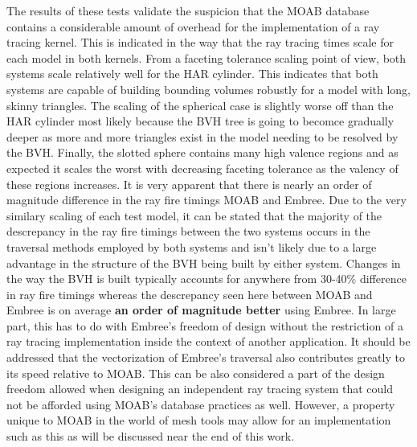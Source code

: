 \documentclass[12pt, a4paper]{article}
\begin{document}
The results of these tests validate the suspicion that the MOAB database contains a considerable amount of overhead for the implementation of a ray tracing kernel. This is indicated in the way that the ray tracing times scale for each model in both kernels. From a faceting tolerance scaling point of view, both systems scale relatively well for the HAR cylinder. This indicates that both systems are capable of building bounding volumes robustly for a model with long, skinny triangles. The scaling of the spherical case is slightly worse off than the HAR cylinder most likely because the BVH tree is going to becomce gradually deeper as more and more triangles exist in the model needing to be resolved by the BVH. Finally, the slotted sphere contains many high valence regions and as expected it scales the worst with decreasing faceting tolerance as the valency of these regions increases. It is very apparent that there is nearly an order of magnitude difference in the ray fire timings MOAB and Embree. Due to the very similary scaling of each test model, it can be stated that the majority of the descrepancy in the ray fire timings between the two systems occurs in the traversal methods employed by both systems and isn't likely due to a large advantage in the structure of the BVH being built by either system. Changes in the way the BVH is built typically accounts for anywhere from 30-40\% difference in ray fire timings whereas the descrepancy seen here between MOAB and Embree is on average \textbf{an order of magnitude better} using Embree. In large part, this has to do with Embree's freedom of design without the restriction of a ray tracing implementation inside the context of another application. It should be addressed that the vectorization of Embree's traversal also contributes greatly to its speed relative to MOAB. This can be also considered a part of the design freedom allowed when designing an independent ray tracing system that could not be afforded using MOAB's database practices as well. However, a property unique to MOAB in the world of mesh tools may allow for an implementation such as this as will be discussed near the end of this work.
\end{document}
